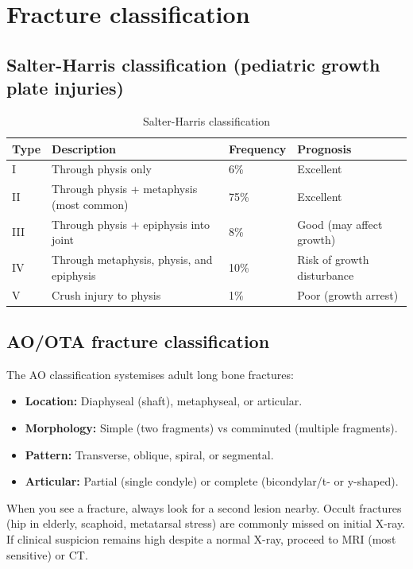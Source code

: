 \section{Fracture classification}

\subsection{Salter-Harris classification (pediatric growth plate injuries)}

\begin{table}[h]
\centering
\caption{Salter-Harris classification}
\label{tab:salter_harris}
\begin{tabular}{@{}p{}p{}p{}p{}@{}}
\hline
\textbf{Type} & \textbf{Description} & \textbf{Frequency} & \textbf{Prognosis} \\
\hline
I & Through physis only & 6\% & Excellent \\
II & Through physis + metaphysis (most common) & 75\% & Excellent \\
III & Through physis + epiphysis into joint & 8\% & Good (may affect growth) \\
IV & Through metaphysis, physis, and epiphysis & 10\% & Risk of growth disturbance \\
V & Crush injury to physis & 1\% & Poor (growth arrest) \\
\hline
\end{tabular}
\end{table}

\subsection{AO/OTA fracture classification}
The AO classification systemises adult long bone fractures:
\begin{itemize}
    \item \textbf{Location:} Diaphyseal (shaft), metaphyseal, or articular.
    \item \textbf{Morphology:} Simple (two fragments) vs comminuted (multiple fragments).
    \item \textbf{Pattern:} Transverse, oblique, spiral, or segmental.
    \item \textbf{Articular:} Partial (single condyle) or complete (bicondylar/t- or y-shaped).
\end{itemize}

\begin{pearlbox}
When you see a fracture, always look for a second lesion nearby. Occult fractures (hip in elderly, scaphoid, metatarsal stress) are commonly missed on initial X-ray. If clinical suspicion remains high despite a normal X-ray, proceed to MRI (most sensitive) or CT.
\end{pearlbox}


